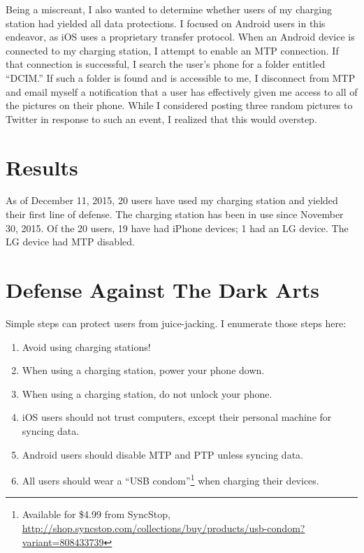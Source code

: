 \documentclass[11pt]{article} %
\begin{document}
\noindent Being a miscreant, I also wanted to determine whether users of my charging station had yielded all data protections. I focused on Android users in this endeavor, as iOS uses a proprietary transfer protocol. When an Android device is connected to my charging station, I attempt to enable an MTP connection. If that connection is successful, I search the user's phone for a folder entitled ``DCIM.'' If such a folder is found and is accessible to me, I disconnect from MTP and email myself a notification that a user has effectively given me access to all of the pictures on their phone. While I considered posting three random pictures to Twitter in response to such an event, I realized that this would overstep.

\section{Results}

As of December 11, 2015, 20 users have used my charging station and yielded their first line of defense. The charging station has been in use since November 30, 2015. Of the 20 users, 19 have had iPhone devices; 1 had an LG device. The LG device had MTP disabled. 

\section{Defense Against The Dark Arts}

Simple steps can protect users from juice-jacking. I enumerate those steps here: 

\begin{enumerate}
\item Avoid using charging stations! 
\item When using a charging station, power your phone down. 
\item When using a charging station, do not unlock your phone. 
\item iOS users should not trust computers, except their personal machine for syncing data. 
\item Android users should disable MTP and PTP unless syncing data. 
\item All users should wear a ``USB condom''\footnote{Available for \$4.99 from SyncStop, \url{http://shop.syncstop.com/collections/buy/products/usb-condom?variant=808433739}} when charging their devices. 

\end{enumerate}
\end{document}

